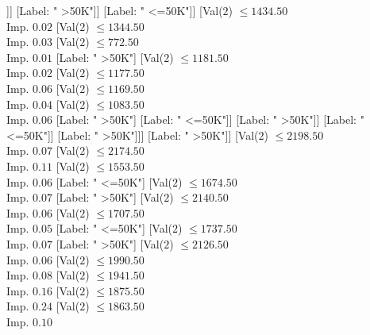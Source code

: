 \documentclass[margin=10pt]{standalone}
\begin{document}
\begin{forest}
						[Val($2$) $ \leq 365.50$ \\ Imp. $0.03$
							[Val($2$) $ \leq 175.50$ \\ Imp. $0.20$
								[Val($2$) $ \leq 133.50$ \\ Imp. $0.19$
									[Val($2$) $ \leq 42.50$ \\ Imp. $0.03$
										[Label: " <=50K"]
										[Val($2$) $ \leq 95.50$ \\ Imp. $0.01$
											[Label: " >50K"]
											[Label: " <=50K"]]]
									[Label: " >50K"]]
								[Label: " <=50K"]]
							[Val($2$) $ \leq 1434.50$ \\ Imp. $0.02$
								[Val($2$) $ \leq 1344.50$ \\ Imp. $0.03$
									[Val($2$) $ \leq 772.50$ \\ Imp. $0.01$
										[Label: " >50K"]
										[Val($2$) $ \leq 1181.50$ \\ Imp. $0.02$
											[Val($2$) $ \leq 1177.50$ \\ Imp. $0.06$
												[Val($2$) $ \leq 1169.50$ \\ Imp. $0.04$
													[Val($2$) $ \leq 1083.50$ \\ Imp. $0.06$
														[Label: " >50K"]
														[Label: " <=50K"]]
													[Label: " >50K"]]
												[Label: " <=50K"]]
											[Label: " >50K"]]]
									[Label: " >50K"]]
								[Val($2$) $ \leq 2198.50$ \\ Imp. $0.07$
									[Val($2$) $ \leq 2174.50$ \\ Imp. $0.11$
										[Val($2$) $ \leq 1553.50$ \\ Imp. $0.06$
											[Label: " <=50K"]
											[Val($2$) $ \leq 1674.50$ \\ Imp. $0.07$
												[Label: " >50K"]
												[Val($2$) $ \leq 2140.50$ \\ Imp. $0.06$
													[Val($2$) $ \leq 1707.50$ \\ Imp. $0.05$
														[Label: " <=50K"]
														[Val($2$) $ \leq 1737.50$ \\ Imp. $0.07$
															[Label: " >50K"]
															[Val($2$) $ \leq 2126.50$ \\ Imp. $0.06$
																[Val($2$) $ \leq 1990.50$ \\ Imp. $0.08$
																	[Val($2$) $ \leq 1941.50$ \\ Imp. $0.16$
																		[Val($2$) $ \leq 1875.50$ \\ Imp. $0.24$
																			[Val($2$) $ \leq 1863.50$ \\ Imp. $0.10$

\end{forest}
\end{document}
